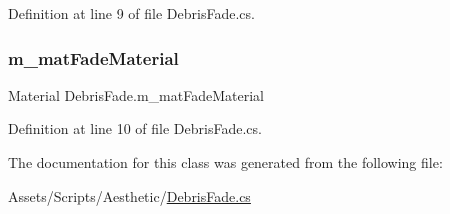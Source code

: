 Definition at line 9 of file Debris\+Fade.\+cs.

\mbox{\label{class_debris_fade_a66049dffe4d626f08481ccb2dadc8256}} 
\subsubsection{\texorpdfstring{m\+\_\+mat\+Fade\+Material}{m\_matFadeMaterial}}
{\footnotesize\ttfamily Material Debris\+Fade.\+m\+\_\+mat\+Fade\+Material}



Definition at line 10 of file Debris\+Fade.\+cs.



The documentation for this class was generated from the following file\+:\begin{DoxyCompactItemize}
\item 
Assets/\+Scripts/\+Aesthetic/\mbox{\hyperlink{_debris_fade_8cs}{Debris\+Fade.\+cs}}\end{DoxyCompactItemize}
